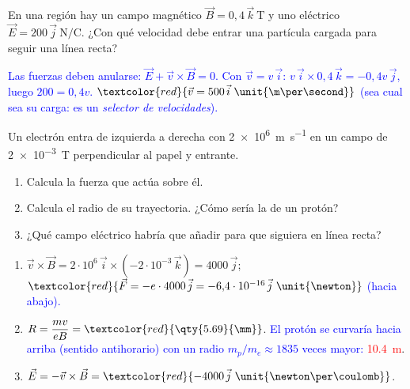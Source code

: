 \begin{exercise}
    En una región hay un campo magnético \(\vec B = 0{,}4\,\vec{k}\ \unit{\tesla}\) y uno eléctrico \(\vec E = 200\,\vec{j}\ \unit{\newton\per\coulomb}\).
    ¿Con qué velocidad debe entrar una partícula cargada para seguir una línea recta?
    \begin{solu}
        \textcolor{blue}{Las fuerzas deben anularse: \(\vec E + \vec v\times\vec B = 0\). Con \(\vec v = v\,\vec{i}\): \(v\,\vec{i}\times 0{,}4\,\vec{k} = -0{,}4v\,\vec{j}\), luego \(200 = 0{,}4v\).}
        \(\textcolor{red}{\vec v = 500\,\vec{i}\ \unit{\m\per\second}}\) \textcolor{blue}{(sea cual sea su carga: es un \emph{selector de velocidades}).}
    \end{solu}
\end{exercise}

\begin{exercise}
    Un electrón entra de izquierda a derecha con \qty{2e6}{\m\per\second} en un campo de \qty{2e-3}{\tesla} perpendicular al papel y entrante.
    \begin{enumerate}[label=\letraminuscula]
        \item Calcula la fuerza que actúa sobre él.
        \item Calcula el radio de su trayectoria. ¿Cómo sería la de un protón?
        \item ¿Qué campo eléctrico habría que añadir para que siguiera en línea recta?
    \end{enumerate}
    \begin{solu}
        \begin{enumerate}[label=\letraminuscula]
            \item \(\vec v\times\vec B = 2\cdot 10^6\,\vec{i}\times(-2\cdot 10^{-3}\,\vec{k}) = 4000\,\vec{j}\);
            \(\textcolor{red}{\vec F = -e\cdot 4000\,\vec{j} = -6{,}4\cdot 10^{-16}\,\vec{j}\ \unit{\newton}}\) \textcolor{blue}{(hacia abajo).}
            \item \(R = \dfrac{mv}{eB} = \textcolor{red}{\qty{5.69}{\mm}}\). \textcolor{blue}{El protón se curvaría hacia arriba (sentido antihorario) con un radio
            \(m_p/m_e \approx 1835\) veces mayor:} \textcolor{red}{\qty{10.4}{\m}}.
            \item \(\vec E = -\vec v\times\vec B = \textcolor{red}{-4000\,\vec{j}\ \unit{\newton\per\coulomb}}\).
        \end{enumerate}
    \end{solu}
\end{exercise}

